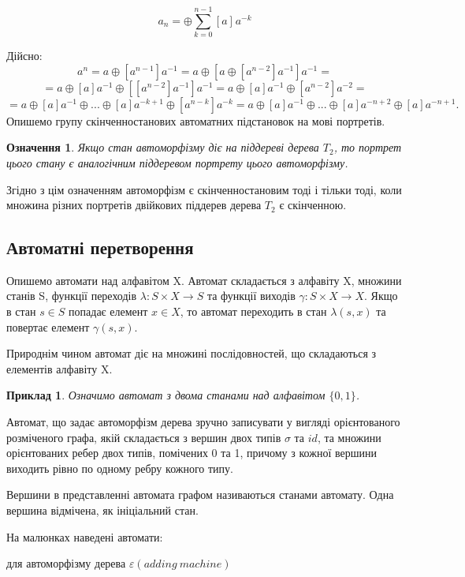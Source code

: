 \documentclass[a4paper,12pt]{article} \usepackage{a4wide}
\numberwithin{equation}{subsection}
\newtheorem{definition}{Означення}[subsection]
\newtheorem{example}{Приклад}[subsection]
\begin{document}
\[
a_n  =  \oplus \sum\limits_{k = 0}^{n - 1} {[a]_{} } a^{ - k}
\]



 Дійсно:
 $$a^n=a\oplus [a^{n-1}]a^{-1}=a\oplus [a\oplus [a^{n-2}]a^{-1}]a^{-1}=$$
 $$=a\oplus [a]a^{-1}\oplus [[a^{n-2}]a^{-1}]a^{-1}=a\oplus [a]a^{-1}\oplus [a^{n-2}]a^{-2}=$$
 $$=a\oplus [a]a^{-1}\oplus...\oplus [a]a^{-k+1} \oplus[a^{n-k}]a^{-k}=a\oplus [a]a^{-1}\oplus...\oplus [a]a^{-n+2} \oplus[a]a^{-n+1}.$$
Опишемо групу скінченностанових автоматних підстановок на мові портретів.
 \begin{definition}Якщо стан автоморфізму діє на піддереві дерева $T_2$, то портрет цього стану є аналогічним піддеревом портрету цього автоморфізму.
 \end{definition}
 Згідно з цім означенням автоморфізм є скінченностановим тоді і тільки тоді, коли множина різних портретів двійкових піддерев дерева $T_2$ є скінченною.

\subsection{Автоматні перетворення}
Опишемо автомати над алфавітом X.
Автомат складається з алфавіту X, множини станів S, функції переходів $\lambda:S\times X\rightarrow S$ та
 функції виходів $\gamma:S\times X\rightarrow X$. Якщо в стан $s\in S$ попадає елемент $x\in X$, то автомат переходить в стан $\lambda(s,x)$
та повертає елемент $\gamma(s,x)$.

Природнім чином автомат діє на множині послідовностей, що складаються з елементів алфавіту X.
\begin{example}
Означимо автомат з двома станами над алфавітом $\{0,1\}$.
\end{example}
Автомат, що задає автоморфізм дерева зручно записувати у вигляді орієнтованого розміченого графа,
 якій складається з вершин двох типів $\sigma$ та $id$, та множини орієнтованих ребер двох типів,
  помічених 0 та 1, причому з кожної вершини виходить рівно по одному ребру кожного типу.


   Вершини в представленні автомата графом називаються станами автомату. Одна вершина відмічена,
    як ініціальний стан.

    На малюнках наведені автомати:

     для автоморфізму дерева $\varepsilon (adding \ machine)$
\end{document}
